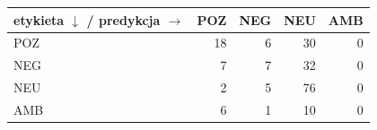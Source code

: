 \begin{tabular}{lrrrr}
\toprule
etykieta $\downarrow$ / predykcja $\rightarrow$ & POZ & NEG & NEU & AMB \\
\midrule
POZ & 18 & 6 & 30 & 0 \\
NEG & 7 & 7 & 32 & 0 \\
NEU & 2 & 5 & 76 & 0 \\
AMB & 6 & 1 & 10 & 0 \\
\bottomrule
\end{tabular}
